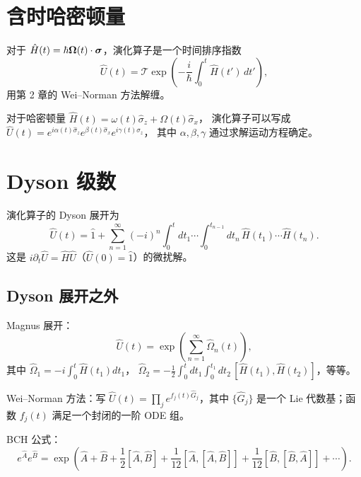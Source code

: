 \section{含时哈密顿量}

对于 $\hat H(t)=\hbar\bm{\Omega}(t)\cdot\bm{\sigma}$，演化算子是一个时间排序指数
\begin{equation}
\hat U(t) = \mathcal T\exp\!\left(-\frac{i}{\hbar}\int_0^t\hat H(t')\,dt'\right),
\label{eq:7.7.1}
\end{equation}
用第 2 章的 Wei--Norman 方法解缠。

对于哈密顿量 $\hat H(t)=\omega(t)\hat\sigma_z+\Omega(t)\hat\sigma_x$，
演化算子可以写成
$\hat U(t)=e^{i\alpha(t)\hat\sigma_z}e^{\beta(t)\hat\sigma_x}e^{i\gamma(t)\hat\sigma_z}$，
其中 $\alpha,\beta,\gamma$ 通过求解运动方程确定。

\section{Dyson 级数}

演化算子的 Dyson 展开为
\begin{equation}
\hat U(t)=\hat 1+\sum_{n=1}^{\infty}(-i)^n\int_0^t dt_1\cdots\int_0^{t_{n-1}}dt_n\,
\hat H(t_1)\cdots\hat H(t_n).
\label{eq:7.8.1}
\end{equation}
这是 $i\partial_t\hat U=\hat H\hat U$（$\hat U(0)=\hat 1$）的微扰解。

\subsection{Dyson 展开之外}

Magnus 展开：
\begin{equation}
\hat U(t) = \exp\!\left(\sum_{n=1}^{\infty}\hat\Omega_n(t)\right),
\label{eq:7.8.2}
\end{equation}
其中 $\hat\Omega_1=-i\int_0^t\hat H(t_1)dt_1$，
$\hat\Omega_2=-\frac12\int_0^t dt_1\int_0^{t_1}dt_2\,[\hat H(t_1),\hat H(t_2)]$，等等。

Wei--Norman 方法：写 $\hat U(t)=\prod_j e^{f_j(t)\hat G_j}$，其中
$\{\hat G_j\}$ 是一个 Lie 代数基；函数 $f_j(t)$ 满足一个封闭的一阶 ODE 组。

BCH 公式：
\begin{equation}
e^{\hat A}e^{\hat B} = \exp\!\left(\hat A+\hat B
+ \frac12[\hat A,\hat B]
+ \frac{1}{12}[\hat A,[\hat A,\hat B]]
+ \frac{1}{12}[\hat B,[\hat B,\hat A]]+\cdots\right).
\label{eq:7.8.3}
\end{equation}

